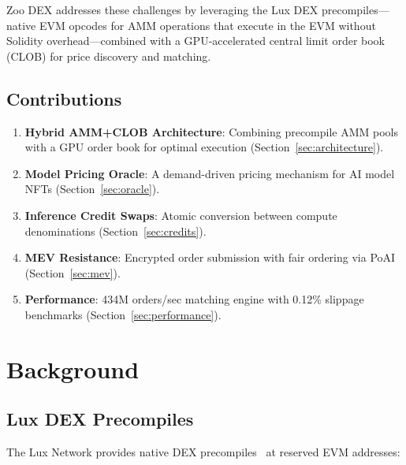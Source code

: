 \documentclass[11pt,letterpaper]{article}
\begin{document}
Zoo DEX addresses these challenges by leveraging the Lux DEX precompiles---native EVM opcodes for AMM operations that execute in the EVM without Solidity overhead---combined with a GPU-accelerated central limit order book (CLOB) for price discovery and matching.

\subsection{Contributions}

\begin{enumerate}
    \item \textbf{Hybrid AMM+CLOB Architecture}: Combining precompile AMM pools with a GPU order book for optimal execution (Section~\ref{sec:architecture}).

    \item \textbf{Model Pricing Oracle}: A demand-driven pricing mechanism for AI model NFTs (Section~\ref{sec:oracle}).

    \item \textbf{Inference Credit Swaps}: Atomic conversion between compute denominations (Section~\ref{sec:credits}).

    \item \textbf{MEV Resistance}: Encrypted order submission with fair ordering via PoAI (Section~\ref{sec:mev}).

    \item \textbf{Performance}: 434M orders/sec matching engine with 0.12\% slippage benchmarks (Section~\ref{sec:performance}).
\end{enumerate}

\section{Background}

\subsection{Lux DEX Precompiles}

The Lux Network provides native DEX precompiles~\cite{lux-dex} at reserved EVM addresses:
\end{document}
